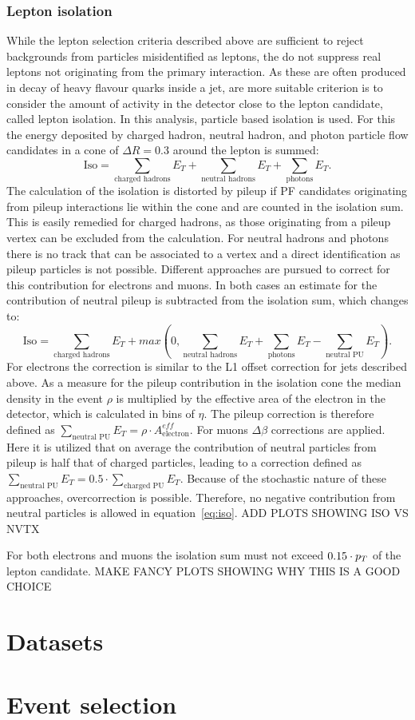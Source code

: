 \subsubsection{Lepton isolation}
While the lepton selection criteria described above are sufficient to reject backgrounds from particles misidentified as leptons, the do not suppress real leptons not originating from the primary interaction. As these are often produced in decay of heavy flavour quarks inside a jet, are more suitable criterion is to consider the amount of activity in the detector close to the lepton candidate, called lepton isolation. In this analysis, particle based isolation is used. For this the energy deposited by charged hadron, neutral hadron, and photon particle flow candidates in a cone of $\Delta R = 0.3$ around the lepton is summed:
\begin{equation}
\text{Iso} = \sum\limits_{\text{charged hadrons}} E_T + \sum\limits_{\text{neutral hadrons}} E_T + \sum\limits_{\text{photons}} E_T.
\end{equation}
The calculation of the isolation is distorted by pileup if PF candidates originating from pileup interactions lie within the cone and are counted in the isolation sum. This is easily remedied for charged hadrons, as those originating from a pileup vertex can be excluded from the calculation. For neutral hadrons and photons there is no track that can be associated to a vertex and a direct identification as pileup particles is not possible. Different approaches are pursued to correct for this contribution for electrons and muons. In both cases an estimate for the contribution of neutral pileup is subtracted from the isolation sum, which changes to:
\begin{equation}
\text{Iso} = \sum\limits_{\text{charged hadrons}} E_T + max(0, \sum\limits_{\text{neutral hadrons}} E_T + \sum\limits_{\text{photons}} E_T - \sum\limits_{\text{neutral PU}} E_T). 
\label{eq:iso}
\end{equation}
For electrons the correction is similar to the L1 offset correction for jets described above. As a measure for the pileup contribution in the isolation cone the median \pt density in the event $\rho$ is multiplied by the effective area of the electron in the detector, which is calculated in bins of $\eta$. The pileup correction is therefore defined as $\sum\limits_{\text{neutral PU}} E_T = \rho\cdot A^{eff}_{\text{electron}}$. For muons $\Delta \beta$ corrections are applied. Here it is utilized that on average the contribution of neutral particles from pileup is half that of charged particles, leading to a correction defined as $\sum\limits_{\text{neutral PU}} E_T = 0.5\cdot \sum\limits_{\text{charged PU}} E_T$. Because of the stochastic nature of these approaches, overcorrection is possible. Therefore, no negative contribution from neutral particles is allowed in equation~\ref{eq:iso}. ADD PLOTS SHOWING ISO VS NVTX

For both electrons and muons the isolation sum must not exceed $0.15\cdot p_{T}$ of the lepton candidate. MAKE FANCY PLOTS SHOWING WHY THIS IS A GOOD CHOICE
\section{Datasets}
\section{Event selection}